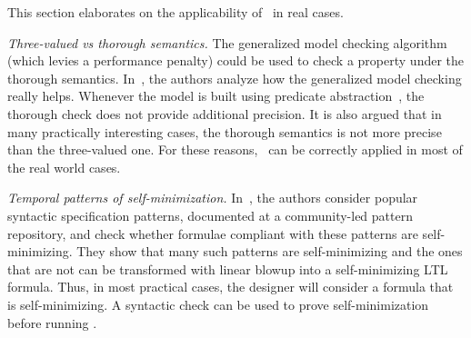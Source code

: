 

This section elaborates on the applicability of \NAME\ in real cases. 

\emph{Three-valued vs thorough semantics.} %
The generalized model checking algorithm~\cite{bruns2000model} (which levies a performance penalty) could be used to check a property under the thorough semantics.
In~\cite{gurfinkel2005thorough}, the authors analyze how the generalized model checking really helps.
Whenever the model is built using predicate abstraction~\cite{graf1997construction}, the thorough check does not provide additional precision.
It is also argued that in many practically interesting cases, the thorough semantics is not more precise than the three-valued one. 
For these reasons, \NAME\ can be correctly applied in most of the real world cases.

\emph{Temporal patterns of self-minimization.} 
In~\cite{antonik2006efficient}, the authors consider popular syntactic specification patterns, documented at a community-led pattern repository, and check whether formulae compliant with these patterns are self-minimizing.
They show that many such patterns are self-minimizing and the ones that are not can be transformed with linear blowup into a self-minimizing LTL formula.
Thus, in most practical cases, the designer will consider a formula that is self-minimizing. 
A syntactic check can be used to prove self-minimization before running \NAME .

